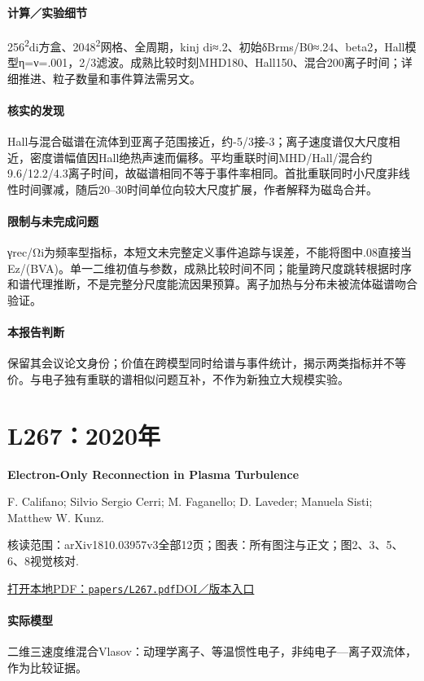 \paragraph{计算／实验细节}256\textsuperscript{2}di方盒、2048\textsuperscript{2}网格、全周期，kinj di≈.2、初始δBrms/B0≈.24、beta2，Hall模型η=ν=.001，2/3滤波。成熟比较时刻MHD180、Hall150、混合200离子时间；详细推进、粒子数量和事件算法需另文。

\paragraph{核实的发现}Hall与混合磁谱在流体到亚离子范围接近，约-5/3接-3；离子速度谱仅大尺度相近，密度谱幅值因Hall绝热声速而偏移。平均重联时间MHD/Hall/混合约9.6/12.2/4.3离子时间，故磁谱相同不等于事件率相同。首批重联同时小尺度非线性时间骤减，随后20–30时间单位向较大尺度扩展，作者解释为磁岛合并。

\paragraph{限制与未完成问题}γrec/Ωi为频率型指标，本短文未完整定义事件追踪与误差，不能将图中.08直接当Ez/(BVA)。单一二维初值与参数，成熟比较时间不同；能量跨尺度跳转根据时序和谱代理推断，不是完整分尺度能流因果预算。离子加热与分布未被流体磁谱吻合验证。

\paragraph{本报告判断}保留其会议论文身份；价值在跨模型同时给谱与事件统计，揭示两类指标并不等价。与电子独有重联的谱相似问题互补，不作为新独立大规模实验。

\section{L267：2020年}\label{paper:L267}

\textbf{Electron-Only Reconnection in Plasma Turbulence}\citep{L267}\

F. Califano;  Silvio Sergio Cerri;  M. Faganello;  D. Laveder;  Manuela Sisti;  Matthew W. Kunz.

\textsf{核读范围：}arXiv1810.03957v3全部12页；\textsf{图表：}所有图注与正文；图2、3、5、6、8视觉核对.

\href{run:papers/L267.pdf}{打开本地PDF：\texttt{papers/L267.pdf}}\quad\href{https://doi.org/10.3389/fphy.2020.00317}{DOI／版本入口}

\paragraph{实际模型}二维三速度维混合Vlasov：动理学离子、等温惯性电子，非纯电子—离子双流体，作为比较证据。

